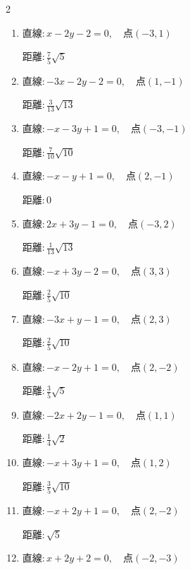 \begin{multicols}{2}
\begin{enumerate}
\columnbreak %

\resetques

  \item $直線:x-2y-2=0,\quad 点 ( -3, 1 )$

        $\displaystyle 距離 : \frac{7}{5}\sqrt{5}$

  \item $直線:-3x-2y-2=0,\quad 点 ( 1, -1 )$

        $\displaystyle 距離 : \frac{3}{13}\sqrt{13}$

  \item $直線:-x-3y+1=0,\quad 点 ( -3, -1 )$

        $\displaystyle 距離 : \frac{7}{10}\sqrt{10}$

  \item $直線:-x-y+1=0,\quad 点 ( 2, -1 )$

        $\displaystyle 距離 : 0$

  \item $直線:2x+3y-1=0,\quad 点 ( -3, 2 )$

        $\displaystyle 距離 : \frac{1}{13}\sqrt{13}$

  \item $直線:-x+3y-2=0,\quad 点 ( 3, 3 )$

        $\displaystyle 距離 : \frac{2}{5}\sqrt{10}$

  \item $直線:-3x+y-1=0,\quad 点 ( 2, 3 )$

        $\displaystyle 距離 : \frac{2}{5}\sqrt{10}$

  \item $直線:-x-2y+1=0,\quad 点 ( 2, -2 )$

        $\displaystyle 距離 : \frac{3}{5}\sqrt{5}$

  \item $直線:-2x+2y-1=0,\quad 点 ( 1, 1 )$

        $\displaystyle 距離 : \frac{1}{4}\sqrt{2}$

  \item $直線:-x+3y+1=0,\quad 点 ( 1, 2 )$

        $\displaystyle 距離 : \frac{3}{5}\sqrt{10}$

\columnbreak %

  \item $直線:-x+2y+1=0,\quad 点 ( 2, -2 )$

        $\displaystyle 距離 : \sqrt{5}$

  \item $直線:x+2y+2=0,\quad 点 ( -2, -3 )$


\end{enumerate}
\end{multicols}
